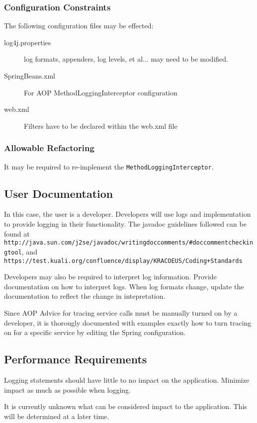 \documentclass[12pt]{report}
\begin{document}
\subsubsection{Configuration Constraints}
The following configuration files may be effected:
\begin{description}
  \item[log4j.properties] log formats, appenders, log levels, et al... may need to be modified. 
  \item[SpringBeans.xml] For AOP MethodLoggingInterceptor configuration
  \item[web.xml] Filters have to be declared within the web.xml file
\end{description}

\subsubsection{Allowable Refactoring}
It may be required to re-implement the \verb|MethodLoggingInterceptor|.

\subsection{User Documentation}
In this case, the user is a developer. Developers will use logs and implementation to provide logging in their functionality.
The javadoc guidelines followed can be found at \verb|http://java.sun.com/j2se/javadoc/writingdoccomments/#doccommentcheckingtool|, 
and \verb|https://test.kuali.org/confluence/display/KRACOEUS/Coding+Standards|

Developers may also be required to interpret log information. Provide documentation on how to interpret logs. When log formats
change, update the documentation to reflect the change in intepretation.

Since AOP Advice for tracing service calls must be manually turned on by a developer, it is thorougly documented with examples
exactly how to turn tracing on for a specific service by editing the Spring configuration.

\subsection{Performance Requirements}
Logging statements should have little to no impact on the application. Minimize impact as much as possible when logging.

It is currently unknown what can be considered impact to the application. This will be determined at a later time.
\end{document}
